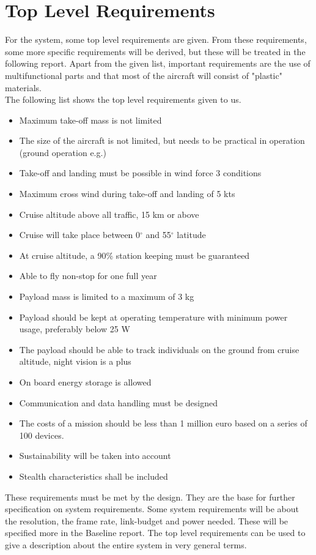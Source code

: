 \documentclass[a4paper]{report}
\begin{document}
\section{Top Level Requirements}
\label{sec:TopLevelRequirements}
For the system, some top level requirements are given. From these requirements, some more specific requirements will be derived, but these will be treated in the following report. Apart from the given list, important requirements are the use of multifunctional parts and that most of the aircraft will consist of "plastic" materials.\\
The following list shows the top level requirements given to us.
\begin{itemize}
\item Maximum take-off mass is not limited
\item The size of the aircraft is not limited, but needs to be practical in operation (ground operation e.g.)
\item Take-off and landing must be possible in wind force 3 conditions
\item Maximum cross wind during take-off and landing of 5 kts
\item Cruise altitude above all traffic, 15 km or above
\item Cruise will take place between 0$^\circ$ and 55$^\circ$ latitude
\item At cruise altitude, a 90\% station keeping must be guaranteed
\item Able to fly non-stop for one full year
\item Payload mass is limited to a maximum of 3 kg
\item Payload should be kept at operating temperature with minimum power usage, preferably below 25 W
\item The payload should be able to track individuals on the ground from cruise altitude, night vision is a plus
\item On board energy storage is allowed
\item Communication and data handling must be designed
\item The costs of a mission should be less than 1 million euro based on a series of 100 devices.
\item Sustainability will be taken into account
\item Stealth characteristics shall be included
\end{itemize}
These requirements must be met by the design. They are the base for further specification on system requirements. Some system requirements will be about the resolution, the frame rate, link-budget and power needed. These will be specified more in the Baseline report. The top level requirements can be used to give a description about the entire system in very general terms.
\end{document}
